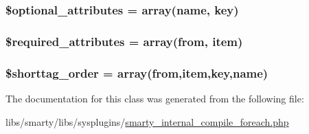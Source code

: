 \subsubsection[{\$optional\+\_\+attributes}]{\setlength{\rightskip}{0pt plus 5cm}\$optional\+\_\+attributes = array(\textquotesingle{}name\textquotesingle{}, \textquotesingle{}key\textquotesingle{})}\label{class_smarty___internal___compile___foreach_a899d1eb4a6fecbd6ce696adb171c80a4}
\hypertarget{class_smarty___internal___compile___foreach_ae799507d5461de485f3a618abeecea95}{}
\subsubsection[{\$required\+\_\+attributes}]{\setlength{\rightskip}{0pt plus 5cm}\$required\+\_\+attributes = array(\textquotesingle{}from\textquotesingle{}, \textquotesingle{}item\textquotesingle{})}\label{class_smarty___internal___compile___foreach_ae799507d5461de485f3a618abeecea95}
\hypertarget{class_smarty___internal___compile___foreach_a2ccb25269c3a92e8c4796c7ef23725e6}{}
\subsubsection[{\$shorttag\+\_\+order}]{\setlength{\rightskip}{0pt plus 5cm}\$shorttag\+\_\+order = array(\textquotesingle{}from\textquotesingle{},\textquotesingle{}item\textquotesingle{},\textquotesingle{}key\textquotesingle{},\textquotesingle{}name\textquotesingle{})}\label{class_smarty___internal___compile___foreach_a2ccb25269c3a92e8c4796c7ef23725e6}


The documentation for this class was generated from the following file\+:\begin{DoxyCompactItemize}
\item 
libs/smarty/libs/sysplugins/\hyperlink{smarty__internal__compile__foreach_8php}{smarty\+\_\+internal\+\_\+compile\+\_\+foreach.\+php}\end{DoxyCompactItemize}
